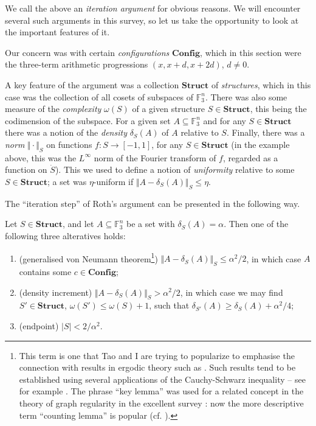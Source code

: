 \documentclass[12pt,a4paper,reqno]{amsart}
\numberwithin{equation}{section}
\theoremstyle{plain}
\theoremstyle{definition}
\renewcommand{\leq}{\leqslant}
\renewcommand{\geq}{\geqslant}
\begin{document}
\noindent We call the above an \textit{iteration argument} for obvious reasons. We will encounter several such arguments in this survey, so let us take the opportunity to look at the important features of it.\vspace{11pt}

\noindent Our concern was with certain \textit{configurations} $\mathbf{Config}$, which in this section were the three-term arithmetic progressions $(x,x+d,x+2d)$, $d \neq 0$.\vspace{11pt}

\noindent A key feature of the argument was a collection $\mathbf{Struct}$ of \textit{structures}, which in this case was the collection of all cosets of subspaces of $\mathbb{F}_3^n$. There was also some measure of the \textit{complexity} $\omega(S)$ of a given structure $S \in \mathbf{Struct}$, this being the codimension of the subspace. For a given set $A \subseteq \mathbb{F}_3^n$  and for any $S \in \mathbf{Struct}$ there was a notion of the \textit{density} $\delta_S(A)$ of $A$ relative to $S$. Finally, there was a \textit{norm} $\Vert \cdot \Vert_S$ on functions $f : S \rightarrow [-1,1]$, for any $S \in \mathbf{Struct}$ (in the example above, this was the $L^{\infty}$ norm of the Fourier transform of $f$, regarded as a function on $\dot{S}$). This we used to define a notion of \textit{uniformity} relative to some $S \in \mathbf{Struct}$; a set was $\eta$-uniform if $\Vert A - \delta_S(A) \Vert_S \leq \eta$. \vspace{11pt}

\noindent The ``iteration step'' of Roth's argument can be presented in the following way.\vspace{11pt}

\noindent Let $S \in \mathbf{Struct}$, and let $A \subseteq \mathbb{F}_3^n$ be a set with $\delta_S(A) = \alpha$. Then one of the following three alteratives holds:
\begin{enumerate}
\item (generalised von Neumann theorem\footnote{This term is one that Tao and I are trying to popularize to emphasise the connection with results in ergodic theory such as \cite[Lemma 3.1]{FKO}. Such results tend to be established using several applications of the Cauchy-Schwarz inequality -- see for example \cite[\S 5]{green-tao-primes}. The phrase ``key lemma'' was used for a related concept in the theory of graph regularity in the excellent survey \cite{komlos-simonovits}: now the more descriptive term ``counting lemma'' is popular (cf. \cite{gowers-hyper,green-reg,nagle-rodl-schacht}).}) $\Vert A - \delta_S(A) \Vert_S \leq \alpha^2/2$, in which case $A$ contains some $c \in \mathbf{Config}$;
\item (density increment) $\Vert A - \delta_S(A) \Vert_S > \alpha^2/2$, in which case we may find $S' \in \mathbf{Struct}$, $\omega(S') \leq \omega(S) + 1$, such that $\delta_{S'}(A) \geq \delta_S(A) + \alpha^2/4$;
\item (endpoint) $|S| < 2/\alpha^2$.
\end{enumerate}
\end{document}
